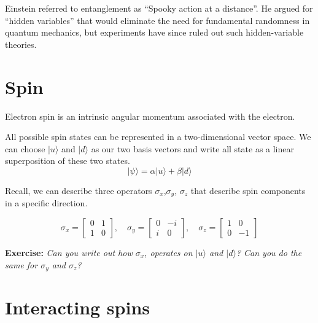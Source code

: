 \documentclass[]{tufte-handout}
\begin{document}
Einstein referred to entanglement as ``Spooky action at a distance''. He argued for ``hidden variables'' that would eliminate the need for fundamental randomness in quantum mechanics, but experiments have since ruled out such hidden-variable theories.

\hypertarget{spin}{%
\section{Spin}\label{spin}}

Electron spin is an intrinsic angular momentum associated with the electron.

All possible spin states can be represented in a two-dimensional vector space. We can choose \(|u\rangle\) and \(|d\rangle\) as our two basis vectors and write all state as a linear superposition of these two states.
\[
|\psi\rangle = \alpha |u\rangle + \beta |d\rangle 
\]

Recall, we can describe three operators \(\sigma_x\),\(\sigma_y\), \(\sigma_z\) that describe spin components in a specific direction.

\[
\sigma_x = \begin{bmatrix} 0 & 1 \\ 1 & 0 \end{bmatrix}, \quad \sigma_y = \begin{bmatrix} 0 & -i \\ i & 0 \end{bmatrix}, \quad \sigma_z = \begin{bmatrix} 1 & 0 \\ 0 & -1 \end{bmatrix}
\]

\textbf{Exercise:} \emph{Can you write out how \(\sigma_x\), operates on \(|u\rangle\) and \(|d\rangle\)? Can you do the same for \(\sigma_y\) and \(\sigma_z\)?}

\newpage

\hypertarget{interacting-spins}{%
\section{Interacting spins}\label{interacting-spins}}
\end{document}
